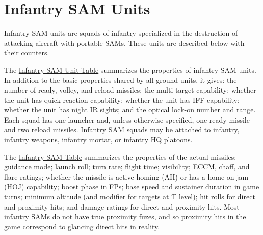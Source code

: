 


\chapter{Infantry SAM Units}
\raggedbottom

Infantry SAM units are squads of infantry specialized in the destruction of attacking aircraft with portable SAMs. These units are described below with their counters.

The \hyperlink{table:infantry-sam-unit}{Infantry SAM Unit Table} summarizes the properties of infantry SAM units. In addition to the basic properties shared by all ground units, it gives:
the number of ready, volley, and reload missiles;
the multi-target capability;
whether the unit has quick-reaction capability;
whether the unit has IFF capability;
whether the unit has night IR sights; and
the optical lock-on number and range.
Each squad has one launcher and, unless otherwise specified, one ready missile and two reload missiles. Infantry SAM squads may be attached to infantry, infantry weapons, infantry mortar, or infantry HQ platoons.


The \hyperlink{table:infantry-sam}{Infantry SAM Table} summarizes the properties of the actual missiles:
guidance mode;
launch roll;
turn rate;
flight time;
visibility;
ECCM, chaff, and flare ratings;
whether the missile is active homing (AH) or has a home-on-jam (HOJ) capability;
boost phase in FPs;
base speed and sustainer duration in game turns;
minimum altitude (and modifier for targets at T level);
hit rolls for direct and proximity hits; and
damage ratings for direct and proximity hits.
Most infantry SAMs do not have true proximity fuzes, and so proximity hits in the game correspond to glancing direct hits in reality.

